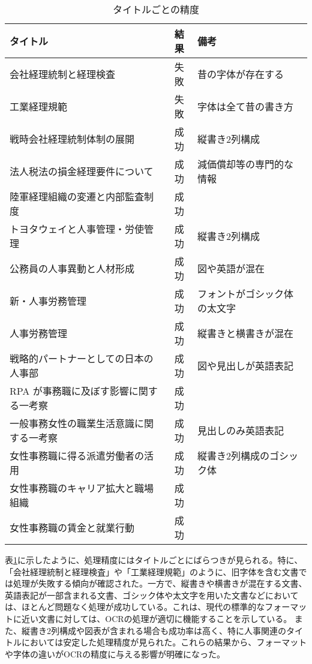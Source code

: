 \begin{table}[h]
  \centering
  \begin{tabular}{|l|c|l|}
    \hline
    \textbf{タイトル} & \textbf{結果} & \textbf{備考} \\ \hline
    会社経理統制と経理検査 & 失敗 & 昔の字体が存在する \\ \hline
    工業経理規範 & 失敗 & 字体は全て昔の書き方 \\ \hline
    戦時会社経理統制体制の展開 & 成功 & 縦書き2列構成 \\ \hline
    法人税法の損金経理要件について & 成功 & 減価償却等の専門的な情報 \\ \hline
    陸軍経理組織の変遷と内部監査制度 & 成功 & \\ \hline
    トヨタウェイと人事管理・労使管理 & 成功 & 縦書き2列構成 \\ \hline
    公務員の人事異動と人材形成 & 成功 & 図や英語が混在 \\ \hline
    新・人事労務管理 & 成功 & フォントがゴシック体の太文字 \\ \hline
    人事労務管理 & 成功 & 縦書きと横書きが混在 \\ \hline
    戦略的パートナーとしての日本の人事部 & 成功 & 図や見出しが英語表記 \\ \hline
    RPA が事務職に及ぼす影響に関する一考察 & 成功 & \\ \hline
    一般事務女性の職業生活意識に関する一考察 & 成功 & 見出しのみ英語表記 \\ \hline
    女性事務職に得る派遣労働者の活用 & 成功 & 縦書き2列構成のゴシック体 \\ \hline
    女性事務職のキャリア拡大と職場組織 & 成功 & \\ \hline
    女性事務職の賃金と就業行動 & 成功 & \\ \hline
  \end{tabular}
  \caption{タイトルごとの精度}
  \label{tab:title_accuracy}
\end{table}

表\ref{tab:title_accuracy}に示したように、処理精度にはタイトルごとにばらつきが見られる。特に、「会社経理統制と経理検査」や「工業経理規範」のように、旧字体を含む文書では処理が失敗する傾向が確認された。一方で、縦書きや横書きが混在する文書、英語表記が一部含まれる文書、ゴシック体や太文字を用いた文書などにおいては、ほとんど問題なく処理が成功している。これは、現代の標準的なフォーマットに近い文書に対しては、OCRの処理が適切に機能することを示している。
また、縦書き2列構成や図表が含まれる場合も成功率は高く、特に人事関連のタイトルにおいては安定した処理精度が見られた。これらの結果から、フォーマットや字体の違いがOCRの精度に与える影響が明確になった。

